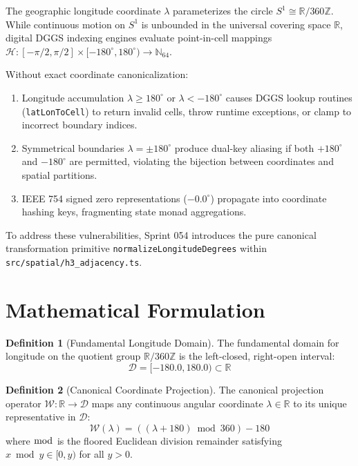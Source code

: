 \documentclass[11pt,a4paper]{article}
\theoremstyle{definition}
\newtheorem{definition}{Definition}
\begin{document}
The geographic longitude coordinate $\lambda$ parameterizes the circle $S^1 \cong \mathbb{R} / 360\mathbb{Z}$. While continuous motion on $S^1$ is unbounded in the universal covering space $\mathbb{R}$, digital DGGS indexing engines evaluate point-in-cell mappings $\mathcal{H}: [-\pi/2, \pi/2] \times [-180^\circ, 180^\circ) \to \mathbb{N}_{64}$.

Without exact coordinate canonicalization:
\begin{enumerate}
    \item Longitude accumulation $\lambda \ge 180^\circ$ or $\lambda < -180^\circ$ causes DGGS lookup routines (\texttt{latLonToCell}) to return invalid cells, throw runtime exceptions, or clamp to incorrect boundary indices.
    \item Symmetrical boundaries $\lambda = \pm 180^\circ$ produce dual-key aliasing if both $+180^\circ$ and $-180^\circ$ are permitted, violating the bijection between coordinates and spatial partitions.
    \item IEEE 754 signed zero representations ($-0.0^\circ$) propagate into coordinate hashing keys, fragmenting state monad aggregations.
\end{enumerate}

To address these vulnerabilities, Sprint 054 introduces the pure canonical transformation primitive \texttt{normalizeLongitudeDegrees} within \texttt{src/spatial/h3\_adjacency.ts}.

\section{Mathematical Formulation}

\begin{definition}[Fundamental Longitude Domain]
The fundamental domain for longitude on the quotient group $\mathbb{R} / 360\mathbb{Z}$ is the left-closed, right-open interval:
\begin{equation}
\mathcal{D} = [-180.0, 180.0) \subset \mathbb{R}
\end{equation}
\end{definition}

\begin{definition}[Canonical Coordinate Projection]
The canonical projection operator $\mathcal{W}: \mathbb{R} \to \mathcal{D}$ maps any continuous angular coordinate $\lambda \in \mathbb{R}$ to its unique representative in $\mathcal{D}$:
\begin{equation}
\mathcal{W}(\lambda) = \left( (\lambda + 180) \bmod 360 \right) - 180
\end{equation}
where $\bmod$ is the floored Euclidean division remainder satisfying $x \bmod y \in [0, y)$ for all $y > 0$.
\end{definition}
\end{document}
